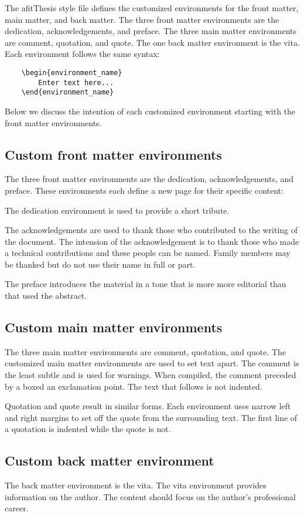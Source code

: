 The afitThesis style file defines the customized environments for the
front matter, main matter, and back matter.  The three front matter
environments are the dedication, acknowledgements, and preface.  The
three main matter environments are comment, quotation, and quote.  The
one back matter environment is the vita.  Each environment follows the
same syntax:

\begin{verbatim}
    \begin{environment_name}
        Enter text here...
    \end{environment_name}
\end{verbatim}

Below we discuss the intention of each customized environment starting
with the front matter environments. 

\subsection{Custom front matter environments}

The three front matter environments are the dedication,
acknowledgements, and preface.  These environments each define a new
page for their specific content:

The dedication environment is used to provide a
short tribute.  

The acknowledgements are used to thank those who
contributed to the writing of the document.  The intension of the
acknowledgement is to thank those who made a technical contributions
and these people can be named.  Family members may be thanked but do
not use their name in full or part.  

The preface introduces the material in a tone that is more more
editorial than that used the abstract.


\subsection{Custom main matter environments}

The three main matter environments are comment, quotation, and quote.
The customized main matter environments are used to set text apart.
The comment is the least subtle and is used for warnings.  When
compiled, the comment preceded by a boxed an exclamation point.  The
text that follows is not indented.

Quotation and quote result in similar forms.  Each environment
uses narrow left and right margins to set off the quote 
from the surrounding text.  The first line of a quotation
is indented while the quote is not.


\subsection{Custom back matter environment}

The back matter environment is the vita.  The vita environment
provides information on the author.  The content should focus on the
author's professional career.



